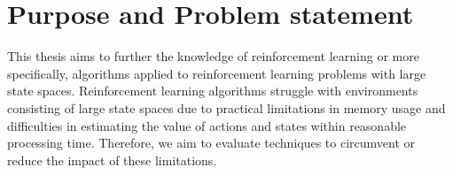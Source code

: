 \section{Purpose and Problem statement}

This thesis aims to further the knowledge of reinforcement learning or more specifically, algorithms applied to reinforcement learning problems with large state spaces. Reinforcement learning algorithms struggle with environments consisting of large state spaces due to practical limitations in memory usage and difficulties in estimating the value of actions and states within reasonable processing time. Therefore, we aim to evaluate techniques to circumvent or reduce the impact of these limitations.

